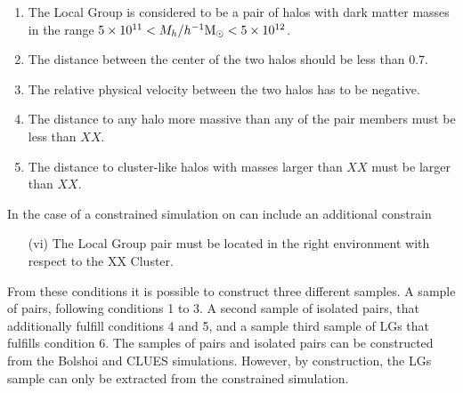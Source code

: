\documentclass[usenatbib]{latex/mn2e}
\begin{document}
\begin{enumerate}
\item{The Local Group is considered to be a pair of halos with dark matter 
masses in the range $5\times10^{11}<M_{h}/\hMsun < 5\times 10^{12}$.}

\item{The distance between the center of the two halos should be less than 
$0.7$\hMpc.}

\item{The relative physical velocity between the two halos has to be 
negative.}

\item{The distance to any halo more massive than any of the pair members 
must be less than $XX$\hMpc.}

\item{The distance to cluster-like halos with masses larger than $XX$\hMpc 
must be larger than $XX$\hMpc.}
\end{enumerate}


In the case of a constrained simulation on can include an additional 
constrain


\begin{enumerate}
\item[(vi)]{The Local Group pair must be located in the right environment 
with respect to the XX Cluster.}
\end{enumerate}


From these conditions it is possible to construct three different samples.
A sample of pairs, following conditions 1 to 3. A second sample of 
isolated pairs, that additionally fulfill conditions 4 and 5, and a sample 
third sample of LGs that fulfills condition 6. The samples of pairs and 
isolated pairs can be constructed from the Bolshoi and CLUES simulations. 
However, by construction, the LGs sample can only be extracted from the 
constrained simulation.
\end{document}
